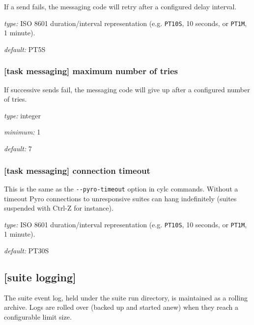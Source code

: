 If a send fails, the messaging code will retry after a configured
delay interval.

\begin{myitemize}
\item {\em type:} ISO 8601 duration/interval representation (e.g.
\lstinline=PT10S=, 10 seconds, or \lstinline=PT1M=, 1 minute).
\item {\em default:} PT5S
\end{myitemize}

\subsubsection[maximum number of tries]{[task messaging] \textrightarrow maximum number of tries}

If successive sends fail, the messaging code will give up after a
configured number of tries.

\begin{myitemize}
\item {\em type:} integer
\item {\em minimum:} 1
\item {\em default:} 7
\end{myitemize}

\subsubsection[connection timeout]{[task messaging] \textrightarrow connection timeout}

This is the same as the \lstinline=--pyro-timeout= option in cylc
commands. Without a timeout Pyro connections to unresponsive
suites can hang indefinitely (suites suspended with Ctrl-Z for instance).

\begin{myitemize}
\item {\em type:} ISO 8601 duration/interval representation (e.g.
\lstinline=PT10S=, 10 seconds, or \lstinline=PT1M=, 1 minute).
\item {\em default:} PT30S
\end{myitemize}

\subsection{[suite logging]}

The suite event log, held under the suite run directory, is maintained
as a rolling archive. Logs are rolled over (backed up and started anew)
when they reach a configurable limit size.

